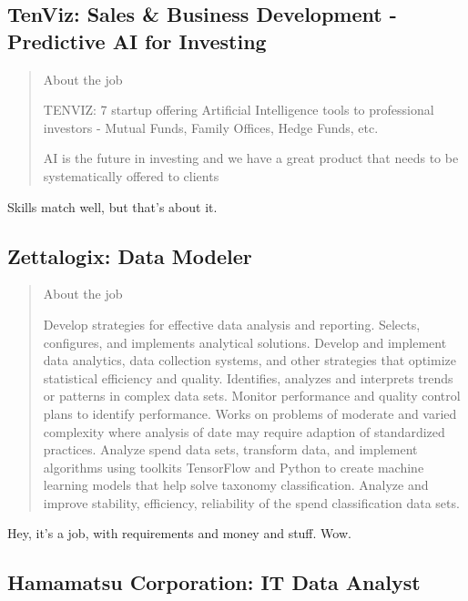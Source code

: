 \documentclass[
	letterpaper, %
	12pt, %
]{CSSullivanBusinessReport}
\begin{document}

\subsection[TenViz]{TenViz: Sales \& Business Development - Predictive AI for Investing}

\begin{quote}
	About the job
	
	TENVIZ: 7 startup offering Artificial Intelligence tools to professional investors - Mutual Funds, Family Offices, Hedge Funds, etc.

	AI is the future in investing and we have a great product that needs to be systematically offered to clients

\end{quote}

Skills match well, but that's about it. 


\subsection[Zettalogix]{Zettalogix: Data Modeler}

\begin{quote}
	About the job
	
    Develop strategies for effective data analysis and reporting. Selects, configures, and implements analytical solutions.
    Develop and implement data analytics, data collection systems, and other strategies that optimize statistical efficiency and quality.
    Identifies, analyzes and interprets trends or patterns in complex data sets.
    Monitor performance and quality control plans to identify performance. Works on problems of moderate and varied complexity where analysis of date may require adaption of standardized practices.
    Analyze spend data sets, transform data, and implement algorithms using toolkits TensorFlow and Python to create machine learning models that help solve taxonomy classification.
    Analyze and improve stability, efficiency, reliability of the spend classification data sets.


\end{quote}

Hey, it's a job, with requirements and money and stuff. Wow.



\subsection[Hamamatsu]{Hamamatsu Corporation: IT Data Analyst}
\end{document}
